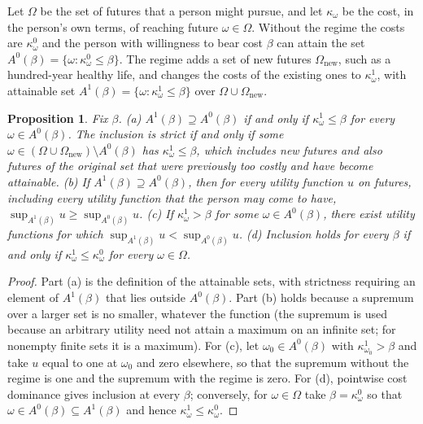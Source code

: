 \documentclass[11pt]{article}
\theoremstyle{plain}
\newtheorem{proposition}{Proposition}
\theoremstyle{definition}
\theoremstyle{remark}
\begin{document}
Let $\Omega$ be the set of futures that a person might pursue, and let $\kappa_\omega$ be the cost, in the person's own terms, of reaching future $\omega\in\Omega$. Without the regime the costs are $\kappa^0_\omega$ and the person with willingness to bear cost $\beta$ can attain the set $A^0(\beta)=\{\omega:\kappa^0_\omega\le\beta\}$. The regime adds a set of new futures $\Omega_{\mathrm{new}}$, such as a hundred-year healthy life, and changes the costs of the existing ones to $\kappa^1_\omega$, with attainable set $A^1(\beta)=\{\omega:\kappa^1_\omega\le\beta\}$ over $\Omega\cup\Omega_{\mathrm{new}}$.

\begin{proposition}\label{prop:enlarge}
Fix $\beta$. (a) $A^1(\beta)\supseteq A^0(\beta)$ if and only if $\kappa^1_\omega\le\beta$ for every $\omega\in A^0(\beta)$. The inclusion is strict if and only if some $\omega\in(\Omega\cup\Omega_{\mathrm{new}})\setminus A^0(\beta)$ has $\kappa^1_\omega\le\beta$, which includes new futures and also futures of the original set that were previously too costly and have become attainable. (b) If $A^1(\beta)\supseteq A^0(\beta)$, then for every utility function $u$ on futures, including every utility function that the person may come to have, $\sup_{A^1(\beta)}u\ge\sup_{A^0(\beta)}u$. (c) If $\kappa^1_\omega>\beta$ for some $\omega\in A^0(\beta)$, there exist utility functions for which $\sup_{A^1(\beta)}u<\sup_{A^0(\beta)}u$. (d) Inclusion holds for every $\beta$ if and only if $\kappa^1_\omega\le\kappa^0_\omega$ for every $\omega\in\Omega$.
\end{proposition}

\begin{proof}
Part (a) is the definition of the attainable sets, with strictness requiring an element of $A^1(\beta)$ that lies outside $A^0(\beta)$. Part (b) holds because a supremum over a larger set is no smaller, whatever the function (the supremum is used because an arbitrary utility need not attain a maximum on an infinite set; for nonempty finite sets it is a maximum). For (c), let $\omega_0\in A^0(\beta)$ with $\kappa^1_{\omega_0}>\beta$ and take $u$ equal to one at $\omega_0$ and zero elsewhere, so that the supremum without the regime is one and the supremum with the regime is zero. For (d), pointwise cost dominance gives inclusion at every $\beta$; conversely, for $\omega\in\Omega$ take $\beta=\kappa^0_\omega$ so that $\omega\in A^0(\beta)\subseteq A^1(\beta)$ and hence $\kappa^1_\omega\le\kappa^0_\omega$.
\end{proof}
\end{document}

